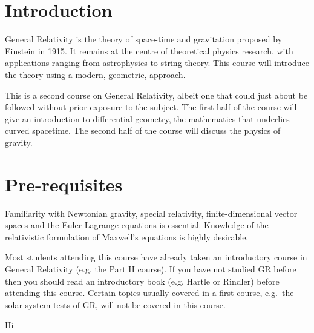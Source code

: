 \documentclass[a4paper,11pt]{article}
\begin{document}
	\maketitlepage
	\preliminaries

	\section*{Introduction}

	\noindent General Relativity is the theory of space-time and gravitation proposed by Einstein in 1915. It remains at the centre of theoretical physics research, with applications ranging from astrophysics to string theory. This course will introduce the theory using a modern, geometric, approach.
	
	\noindent This is a second course on General Relativity, albeit one that could just about be followed without prior exposure to the subject. The first half of the course will give an introduction to differential geometry, the mathematics that underlies curved spacetime. The second half of the course will discuss the physics of gravity.

	\section*{Pre-requisites}
	
	\noindent Familiarity with Newtonian gravity, special relativity, finite-dimensional vector spaces and the Euler-Lagrange equations is essential. Knowledge of the relativistic formulation of Maxwell’s equations is highly desirable.
	
	\noindent Most students attending this course have already taken an introductory course in General Relativity (e.g. the Part II course). If you have not studied GR before then you should read an introductory book (e.g. Hartle or Rindler) before attending this course. Certain topics usually covered in a first course, e.g.\ the solar system tests of GR, will not be covered in this course.

	\newpage
	\tableofcontents
	\newpage
	\maintext
	Hi
	
\end{document}
